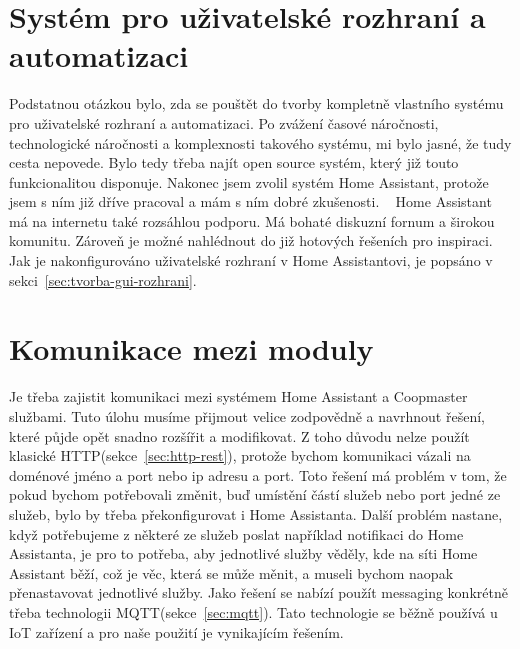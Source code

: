 \section{Systém pro uživatelské rozhraní a automatizaci}\label{sec:systemu-pro-uzivatelske-rozhrani-a-automatizaci}
Podstatnou otázkou bylo, zda se pouštět do tvorby kompletně vlastního systému pro uživatelské rozhraní a automatizaci.
Po zvážení časové náročnosti, technologické náročnosti a komplexnosti takového systému, mi bylo jasné, že tudy cesta nepovede.
Bylo tedy třeba najít open source systém, který již touto funkcionalitou disponuje.
Nakonec jsem zvolil systém Home Assistant, protože jsem s ním již dříve pracoval a mám s ním dobré zkušenosti. ~\cite{homeassistant-web}
Home Assistant má na internetu také rozsáhlou podporu.
Má bohaté diskuzní fornum a širokou komunitu.
Zároveň je možné nahlédnout do již hotových řešeních pro inspiraci.
Jak je nakonfigurováno uživatelské rozhraní v Home Assistantovi, je popsáno v sekci~\ref{sec:tvorba-gui-rozhrani}.

\section{Komunikace mezi moduly}\label{sec:komunikace-mezi-backendem-a-frontendem}
Je třeba zajistit komunikaci mezi systémem Home Assistant a Coopmaster službami.
Tuto úlohu musíme přijmout velice zodpovědně a navrhnout řešení, které půjde opět snadno rozšířit a modifikovat.
Z toho důvodu nelze použít klasické HTTP(sekce~\ref{sec:http-rest}), protože bychom komunikaci vázali na  doménové jméno a port nebo ip adresu a port.
Toto řešení má problém v tom, že pokud bychom potřebovali změnit, buď umístění částí služeb nebo port jedné ze služeb, bylo by třeba překonfigurovat i Home Assistanta.
Další problém nastane, když potřebujeme z některé ze služeb poslat například notifikaci do Home Assistanta, je pro to potřeba, aby jednotlivé služby věděly, kde na síti Home Assistant běží, což je věc, která se může měnit, a museli bychom naopak přenastavovat jednotlivé služby.
Jako řešení se nabízí použít messaging konkrétně třeba technologii MQTT(sekce~\ref{sec:mqtt}).
Tato technologie se běžně používá u IoT zařízení a pro naše použití je vynikajícím řešením.

